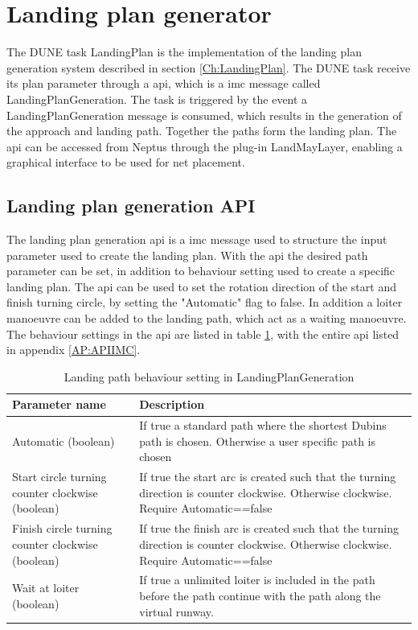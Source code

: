 \section{Landing plan generator}
The DUNE task LandingPlan is the implementation of the landing plan generation system described in section \ref{Ch:LandingPlan}. The DUNE task receive its plan parameter through a \gls{api}, which is a \gls{imc} message called LandingPlanGeneration. The task is triggered by the event a LandingPlanGeneration message is consumed, which results in the generation of the approach and landing path. Together the paths form the landing plan. The \gls{api} can be accessed from Neptus through the plug-in LandMayLayer, enabling a graphical interface to be used for net placement.
\subsection{Landing plan generation API}
The landing plan generation \gls{api} is a \gls{imc} message used to structure the input parameter used to create the landing plan. With the \gls{api} the desired path parameter can be set, in addition to behaviour setting used to create a specific landing plan. The \gls{api} can be used to set the rotation direction of the start and finish turning circle, by setting the "Automatic" flag to false. In addition a loiter manoeuvre can be added to the landing path, which act as a waiting manoeuvre. The behaviour settings in the \gls{api} are listed in table \ref{Tb:DubinConfig}, with the entire \gls{api} listed in appendix \ref{AP:APIIMC}.
\begin{table}[H]
\centering
\begin{tabular}{| p{2.7cm} | | p{6cm} |}
\hline
\textbf{Parameter name} 							& \textbf{Description} \\ \hline
 Automatic (boolean)								& If true a standard path where the shortest Dubins path is chosen. Otherwise a user specific path is chosen \\ \hline
Start circle turning counter clockwise (boolean)	& If true the start arc is created such that the turning direction is counter clockwise. Otherwise clockwise. Require Automatic==false \\ \hline
Finish circle turning counter clockwise (boolean)	& If true the finish arc is created such that the turning direction is counter clockwise. Otherwise clockwise. Require Automatic==false \\ \hline
Wait at loiter (boolean)							& If true a unlimited loiter is included in the path before the path continue with the path along the virtual runway. \\ \hline

\end{tabular}
\caption{Landing path behaviour setting in LandingPlanGeneration}
\label{Tb:DubinConfig}
\end{table}
